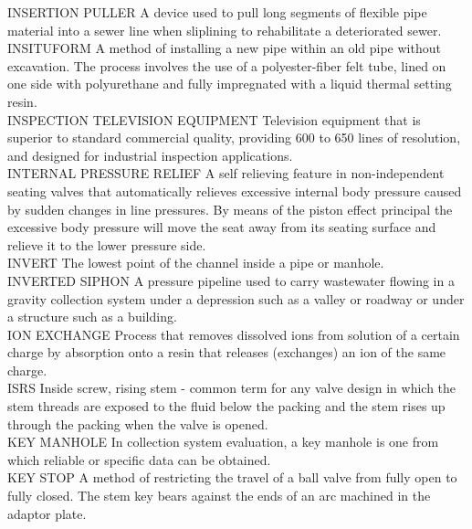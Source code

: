 INSERTION PULLER
A device used to pull long segments of flexible pipe material into a sewer line when sliplining to rehabilitate a deteriorated sewer. 
\vspace{0.3cm}\\
INSITUFORM
A method of installing a new pipe within an old pipe without excavation. The process involves the use of a polyester-fiber felt tube, lined on one side with polyurethane and fully impregnated with a liquid thermal setting resin. 
\vspace{0.3cm}\\
INSPECTION TELEVISION EQUIPMENT
Television equipment that is superior to standard commercial quality, providing 600 to 650 lines of resolution, and designed for industrial inspection applications. 
\vspace{0.3cm}\\
INTERNAL PRESSURE RELIEF
A self relieving feature in non-independent seating valves that automatically relieves excessive internal body pressure caused by sudden changes in line pressures. By means of the piston effect principal the excessive body pressure will move the seat away from its seating surface and relieve it to the lower pressure side.
\vspace{0.3cm}\\
INVERT
The lowest point of the channel inside a pipe or manhole. 
\vspace{0.3cm}\\
INVERTED SIPHON
A pressure pipeline used to carry wastewater flowing in a gravity collection system under a depression such as a valley or roadway or under a structure such as a building.
\vspace{0.3cm}\\
ION EXCHANGE
Process that removes dissolved ions from solution of a certain charge by absorption onto a resin that releases (exchanges) an ion of the same charge.
\vspace{0.3cm}\\
ISRS
Inside screw, rising stem - common term for any valve design in which the stem threads are exposed to the fluid below the packing and the stem rises up through the packing when the valve is opened.
\vspace{0.3cm}\\
KEY MANHOLE
In collection system evaluation, a key manhole is one from which reliable or specific data can be obtained. 
\vspace{0.3cm}\\
KEY STOP
A method of restricting the travel of a ball valve from fully open to fully closed. The stem key bears against the ends of an arc machined in the adaptor plate.
